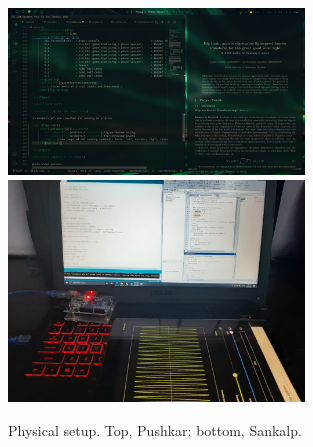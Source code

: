 \begin{figure}[ht]
    \centering
    \includegraphics[width=0.7\textwidth]{fig/pushkreal.png}
    \includegraphics[width=0.7\textwidth]{fig/sankareal.png}
    \caption{Physical setup. Top, Pushkar; bottom, Sankalp.}
    \label{fig:realsetup}
\end{figure}
